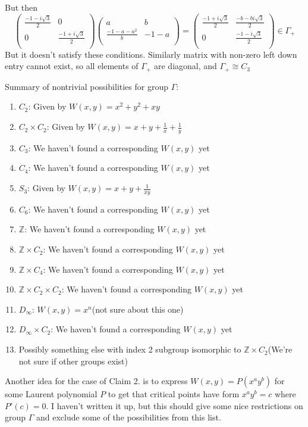 \documentclass[a4paper]{article}
\begin{document}
But then 
$$\begin{pmatrix}
\frac{-1-i\sqrt{3}}{2} & 0 \\ 
0 &  \frac{-1+i\sqrt{3}}{2}\\
\end{pmatrix} \begin{pmatrix}
a & b \\ 
\frac{-1-a-a^2}{b} & -1-a \\
\end{pmatrix} = \begin{pmatrix}
\frac{-1+i\sqrt{3}}{2} & \frac{-b-b i\sqrt{3}}{2} \\ 
0 & \frac{-1-i\sqrt{3}}{2} \\
\end{pmatrix} \in \Gamma_+$$
But it doesn't satisfy these conditions.
Similarly matrix with non-zero left down entry cannot exist, so all elements of $\Gamma_+$ are diagonal, and $\Gamma_+ \cong C_3$

 
Summary of nontrivial possibilities for group $\Gamma$:
\begin{enumerate}
	\item $C_2$: Given by $W(x,y) = x^2 + y^2+ x y$ 
	\item $C_2 \times C_2$: Given by $W(x,y) = x+ y +\frac{1}{x}+\frac{1}{y}$
	\item $C_3$: We haven't found a corresponding $W(x,y)$ yet
	\item $C_4$: We haven't found a corresponding $W(x,y)$ yet
	\item $S_3$: Given by $W(x,y) = x + y +\frac{1}{xy}$
	\item $C_6$: We haven't found a corresponding $W(x,y)$ yet
	\item $\mathbb{Z}$: We haven't found a corresponding $W(x,y)$ yet
	\item $\mathbb{Z} \times C_2$: We haven't found a corresponding $W(x,y)$ yet
	\item $\mathbb{Z} \times C_4$: We haven't found a corresponding $W(x,y)$ yet
	\item $\mathbb{Z} \times C_2 \times C_2$: We haven't found a corresponding $W(x,y)$ yet
	\item $D_\infty$: $W(x,y) = x^n$(not sure about this one)
	\item $D_\infty \times C_2$: We haven't found a corresponding $W(x,y)$ yet
	\item Possibly something else with index 2 subgroup isomorphic to $\mathbb{Z} \times C_2$(We're not sure if other groups exist)
\end{enumerate}

Another idea for the case of Claim 2. is to express $W(x,y) = P(x^a y^b)$ for some Laurent polynomial $P$ to get that critical points have form $x^a y^b = c$ where $P'(c) = 0$. I haven't written it up, but this should give some nice restrictions on group $\Gamma$ and exclude some of the possibilities from this list.
\end{document}
